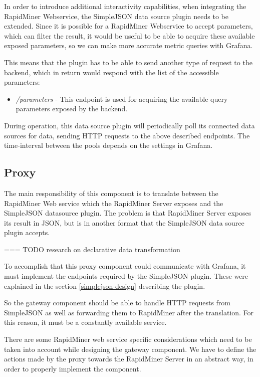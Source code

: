 In order to introduce additional interactivity capabilities, when integrating the RapidMiner Webservice, the SimpleJSON data source plugin needs to be extended. Since it is possible for a RapidMiner Webservice to accept parameters, which can filter the result, it would be useful to be able to acquire these available exposed parameters, so we can make more accurate metric queries with Grafana.

This means that the plugin has to be able to send another type of request to the backend, which in return would respond with the list of the accessible parameters:

\begin{itemize}
	\item \emph{/parameters} - This endpoint is used for acquiring the available query parameters exposed by the backend.
\end{itemize}

During operation, this data source plugin will periodically poll its connected data sources for data, sending HTTP requests to the above described endpoints. The time-interval between the pools depends on the settings in Grafana.

\subsection{Proxy} \label{proxy-design}

The main responsibility of this component is to translate between the RapidMiner Web service which the RapidMiner Server exposes and the SimpleJSON datasource plugin. The problem is that RapidMiner Server exposes its result in JSON, but is in another format that the SimpleJSON data source plugin accepts.

\begin{center}
	=== TODO research on declarative data transformation
\end{center}

To accomplish that this proxy component could communicate with Grafana, it must implement the endpoints required by the SimpleJSON plugin. These were explained in the section \ref{simplejson-design} describing the plugin.

So the gateway component should be able to handle HTTP requests from SimpleJSON as well as forwarding them to RapidMiner after the translation. For this reason, it must be a constantly available service.

There are some RapidMiner web service specific considerations which need to be taken into account while designing the gateway component. We have to define the actions made by the proxy towards the RapidMiner Server in an abstract way, in order to properly implement the component.

